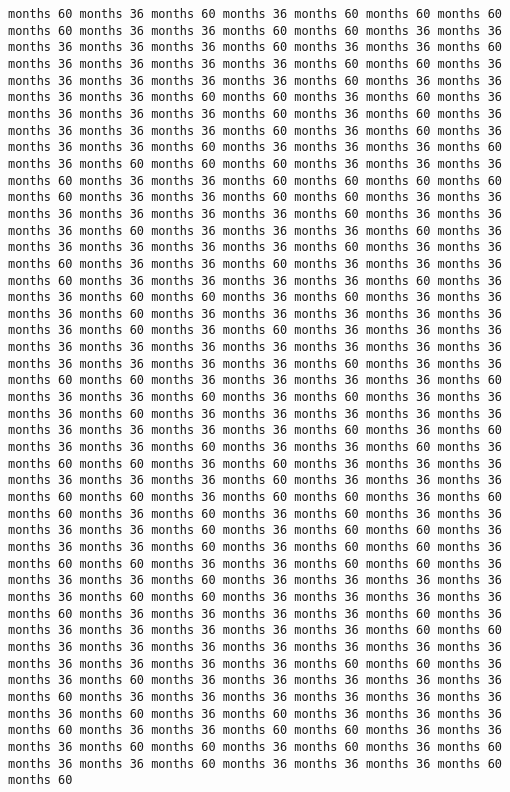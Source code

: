 \documentclass[11pt]{article}
\begin{document}
\begin{Verbatim}[commandchars=\\\{\}, frame=single, framerule=2mm, rulecolor=\color{outerrorbackground}]
months 60 months 36 months 60 months 36 months 60 months 60 months 60 months 60 months 36 months 36 months 60 months 60 months 36 months 36 months 36 months 36 months 36 months 60 months 36 months 36 months 60 months 36 months 36 months 36 months 36 months 60 months 60 months 36 months 36 months 36 months 36 months 36 months 60 months 36 months 36 months 36 months 36 months 60 months 60 months 36 months 60 months 36 months 36 months 36 months 36 months 60 months 36 months 60 months 36 months 36 months 36 months 36 months 60 months 36 months 60 months 36 months 36 months 36 months 60 months 36 months 36 months 36 months 60 months 36 months 60 months 60 months 60 months 36 months 36 months 36 months 60 months 36 months 36 months 60 months 60 months 60 months 60 months 60 months 36 months 36 months 60 months 60 months 36 months 36 months 36 months 36 months 36 months 36 months 60 months 36 months 36 months 36 months 60 months 36 months 36 months 36 months 60 months 36 months 36 months 36 months 36 months 36 months 60 months 36 months 36 months 60 months 36 months 36 months 60 months 36 months 36 months 36 months 60 months 36 months 36 months 36 months 36 months 60 months 36 months 36 months 60 months 60 months 36 months 60 months 36 months 36 months 36 months 60 months 36 months 36 months 36 months 36 months 36 months 36 months 60 months 36 months 60 months 36 months 36 months 36 months 36 months 36 months 36 months 36 months 36 months 36 months 36 months 36 months 36 months 36 months 36 months 60 months 36 months 36 months 60 months 60 months 36 months 36 months 36 months 36 months 60 months 36 months 36 months 60 months 36 months 60 months 36 months 36 months 36 months 60 months 36 months 36 months 36 months 36 months 36 months 36 months 36 months 36 months 36 months 60 months 36 months 60 months 36 months 36 months 60 months 36 months 36 months 60 months 36 months 60 months 60 months 36 months 60 months 36 months 36 months 36 months 36 months 36 months 36 months 60 months 36 months 36 months 36 months 60 months 60 months 36 months 60 months 60 months 36 months 60 months 60 months 36 months 60 months 36 months 60 months 36 months 36 months 36 months 36 months 60 months 36 months 60 months 60 months 36 months 36 months 36 months 60 months 36 months 60 months 60 months 36 months 60 months 60 months 36 months 36 months 60 months 60 months 36 months 36 months 36 months 60 months 36 months 36 months 36 months 36 months 36 months 60 months 60 months 36 months 36 months 36 months 36 months 60 months 36 months 36 months 36 months 36 months 60 months 36 months 36 months 36 months 36 months 36 months 36 months 60 months 60 months 36 months 36 months 36 months 36 months 36 months 36 months 36 months 36 months 36 months 36 months 36 months 60 months 60 months 36 months 36 months 60 months 36 months 36 months 36 months 36 months 36 months 60 months 36 months 36 months 36 months 36 months 36 months 36 months 36 months 60 months 36 months 60 months 36 months 36 months 36 months 60 months 36 months 36 months 60 months 60 months 36 months 36 months 36 months 60 months 60 months 36 months 60 months 36 months 60 months 36 months 36 months 60 months 36 months 36 months 36 months 60 months 60 
\end{Verbatim}
\end{document}
